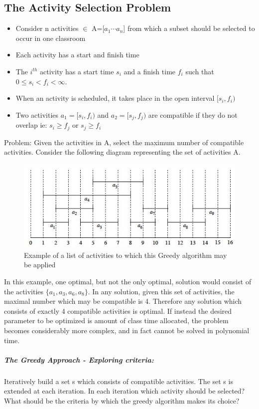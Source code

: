 \documentclass[12pt,letterpaper]{article}
\begin{document}
\subsection{The Activity Selection Problem}
\begin{itemize}
\item Consider n activities $\in$ A=[$a_1 \cdots a_n$] from which a subset should be selected to occur in one classroom
\item Each activity has a start and finish time
\item The $i^{th}$ activity has a start time $s_i$ and a finish time $f_i$ such that $0\leq s_i < f_i < \infty$.
\item When an activity is scheduled, it takes place in the open interval $[s_i, f_i)$
\item Two activities $a_1=[s_i, f_i)$ and $a_2=[s_j, f_j)$ are compatible if they do not overlap ie: $s_i \geq f_j$ or $s_j \geq f_i$
\end{itemize}
Problem: Given the activities in A, select the maximum number of compatible activities. Consider the following diagram representing the set of activities A.
\begin{figure}[htb!]
\centering
\includegraphics[width=12cm]{greedyactivity}
\caption{Example of a list of activities to which this Greedy algorithm may be applied}
\end{figure}
In this example, one optimal, but not the only optimal, solution would consist of the activities $\{a_1, a_3, a_6, a_8\}$. In any solution, given this set of activities, the maximal number which may be compatible is 4. Therefore any solution which consists of exactly 4 compatible activities is optimal. If instead the desired parameter to be optimized is amount of class time allocated, the problem becomes considerably more complex, and in fact cannot be solved in polynomial time.
\subparagraph{The Greedy Approach - Exploring criteria:}
Iteratively build a set s which consists of compatible activities. The set s is extended at each iteration. In each iteration which activity should be selected? What should be the criteria by which the greedy algorithm makes its choice?
\end{document}
